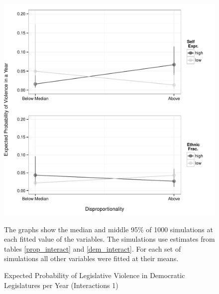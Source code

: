 \documentclass[a4paper]{article}\usepackage[]{graphicx}\usepackage[]{color}
\newenvironment{knitrout}{}{} %
\begin{document}
\begin{figure}
    \begin{center}
\begin{knitrout}
\color{fgcolor}
\includegraphics[width=0.95\linewidth]{figure/predProInteract1-1} 

\end{knitrout}

    \end{center}
    \caption{Expected Probability of Legislative Violence in Democratic Legislatures per Year (Interactions 1)}
    \label{interact_plots1}
    \begin{singlespace}
      {\scriptsize{The graphs show the median and middle 95\% of 1000 simulations at each fitted value of the variables. The simulations use estimates from tables \ref{prop_interact} and \ref{dem_interact}. For each set of simulations all other variables were fitted at their means.}}
    \end{singlespace}
\end{figure}
\end{document}
